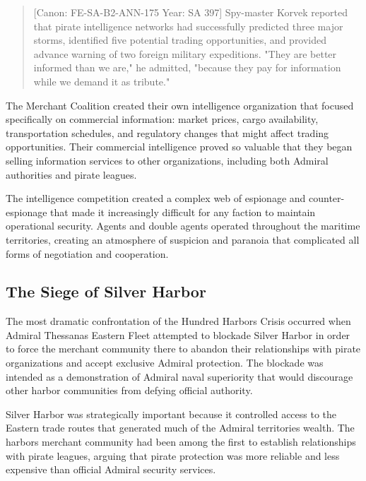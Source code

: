 \begin{quote}
{[}Canon: FE-SA-B2-ANN-175 \textbar{} Year: SA 397{]} Spy-master Korvek
reported that pirate intelligence networks had successfully predicted
three major storms, identified five potential trading opportunities, and
provided advance warning of two foreign military expeditions. "They are
better informed than we are," he admitted, "because they pay for
information while we demand it as tribute."
\end{quote}

The Merchant Coalition created their own intelligence organization that
focused specifically on commercial information: market prices, cargo
availability, transportation schedules, and regulatory changes that
might affect trading opportunities. Their commercial intelligence proved
so valuable that they began selling information services to other
organizations, including both Admiral authorities and pirate leagues.

The intelligence competition created a complex web of espionage and
counter-espionage that made it increasingly difficult for any faction to
maintain operational security. Agents and double agents operated
throughout the maritime territories, creating an atmosphere of suspicion
and paranoia that complicated all forms of negotiation and cooperation.

\subsection{The Siege of Silver
Harbor}\label{the-siege-of-silver-harbor}

The most dramatic confrontation of the Hundred Harbors Crisis occurred
when Admiral Thessana\textquotesingle s Eastern Fleet attempted to
blockade Silver Harbor in order to force the merchant community there to
abandon their relationships with pirate organizations and accept
exclusive Admiral protection. The blockade was intended as a
demonstration of Admiral naval superiority that would discourage other
harbor communities from defying official authority.

Silver Harbor was strategically important because it controlled access
to the Eastern trade routes that generated much of the Admiral
territories\textquotesingle{} wealth. The harbor\textquotesingle s
merchant community had been among the first to establish relationships
with pirate leagues, arguing that pirate protection was more reliable
and less expensive than official Admiral security services.


